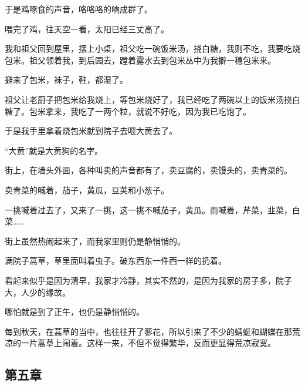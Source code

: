 \par 于是鸡啄食的声音，咯咯咯的响成群了。
\par 喂完了鸡，往天空一看，太阳已经三丈高了。
\par 我和祖父回到屋里，摆上小桌，祖父吃一碗饭米汤，挠白糖，我则不吃，我要吃烧包米。祖父领着我，到后园去，蹚着露水去到包米丛中为我擗一穗包米来。
\par 擗来了包米，袜子，鞋，都湿了。
\par 祖父让老厨子把包米给我烧上，等包米烧好了，我已经吃了两碗以上的饭米汤挠白糖了。包米拿来，我吃了一两个粒，就说不好吃，因为我已吃饱了。
\par 于是我手里拿着烧包米就到院子去喂大黄去了。
\par “大黄”就是大黄狗的名字。
\par 街上，在墙头外面，各种叫卖的声音都有了，卖豆腐的，卖馒头的，卖青菜的。
\par 卖青菜的喊着，茄子，黄瓜，豆荚和小葱子。
\par 一挑喊着过去了，又来了一挑，这一挑不喊茄子，黄瓜。而喊着，芹菜，韭菜，白菜……
\par 街上虽然热闹起来了，而我家里则仍是静悄悄的。
\par 满院子蒿草，草里面叫着虫子。破东西东一件西一样的扔着。
\par 看起来似乎是因为清早，我家才冷静，其实不然的，是因为我家的房子多，院子大，人少的缘故。
\par 哪怕就是到了正午，也仍是静悄悄的。
\par 每到秋天，在蒿草的当中，也往往开了蓼花，所以引来了不少的蜻蜓和蝴蝶在那荒凉的一片蒿草上闹着。这样一来，不但不觉得繁华，反而更显得荒凉寂寞。


\subsection{第五章}

